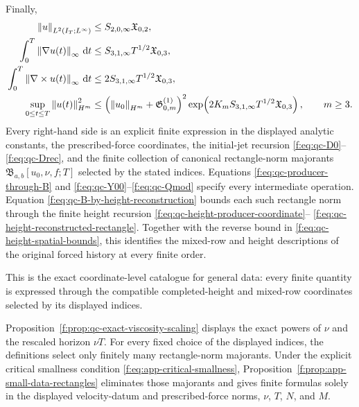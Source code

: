 {\begin{theorem}
Finally,
\begin{align}
 \left\lVert u\right\rVert_{L^2(I_T;L^\infty)}
 &\le S_{2,0,\infty}\mathfrak X_{0,2},
 \label{f:eq:qc-sharp-L2Linfty}\\
 \int_0^T\left\lVert \nabla u(t)\right\rVert_\infty\,\mathrm d t
 &\le S_{3,1,\infty}T^{1/2}\mathfrak X_{0,3},
 \label{f:eq:qc-sharp-lipschitz-action}\\
 \int_0^T\left\lVert \nabla\times u(t)\right\rVert_\infty\,\mathrm d t
 &\le2S_{3,1,\infty}T^{1/2}\mathfrak X_{0,3},
 \label{f:eq:qc-sharp-vorticity-action}\\
 \sup_{0\le t\le T}\left\lVert u(t)\right\rVert_{H^m}^2
 &\le\left(\left\lVert u_0\right\rVert_{H^m}+\mathfrak G^{(1)}_{0,m}\right)^2
 \exp\!\left(
 2K_mS_{3,1,\infty}T^{1/2}\mathfrak X_{0,3}
 \right),
 \qquad m\ge3.
 \label{f:eq:qc-sharp-continuation-growth}
\end{align}
Every right-hand side is an explicit finite expression in the displayed
analytic constants, the prescribed-force coordinates, the initial-jet recursion
\eqref{f:eq:qc-D0}--\eqref{f:eq:qc-Drec}, and the finite collection of canonical
rectangle-norm majorants \(\mathfrak B_{a,b}[u_0,\nu,f;T]\) selected by the stated
indices.  Equations \eqref{f:eq:qc-producer-through-B} and
\eqref{f:eq:qc-Y00}--\eqref{f:eq:qc-Qmod} specify every intermediate operation.
Equation \eqref{f:eq:qc-B-by-height-reconstruction} bounds each such rectangle
norm through the finite height recursion
\eqref{f:eq:qc-height-producer-coordinate}--%
\eqref{f:eq:qc-height-reconstructed-rectangle}.  Together with the reverse
bound in \eqref{f:eq:qc-height-spatial-bounds}, this identifies the mixed-row
and height descriptions of the original forced history at every finite order.
\begin{samepage}
This is the exact coordinate-level catalogue for general data: every finite
quantity is expressed through the compatible completed-height and mixed-row
coordinates selected by its displayed indices.\par
\end{samepage}
Proposition~\ref{f:prop:qc-exact-viscosity-scaling} displays the exact powers of
\(\nu\) and the rescaled horizon \(\nu T\).  For every fixed choice of the
displayed indices, the definitions select only finitely many rectangle-norm
majorants.
Under the explicit critical smallness condition
\eqref{f:eq:app-critical-smallness}, Proposition~\ref{f:prop:app-small-data-rectangles}
eliminates those majorants and gives finite formulas solely in the
displayed velocity-datum and prescribed-force norms, \(\nu\), \(T\),
\(N\), and \(M\).
\end{theorem}

}
